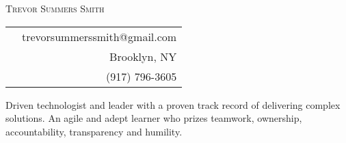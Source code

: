 \documentclass[letter]{article}
\begin{document}
\noindent \Huge \textsc{Trevor Summers Smith} \hfill \small
\begin{tabular}{rr}
& trevorsummerssmith@gmail.com \\
& Brooklyn, NY \\
& (917) 796-3605 \\
\end{tabular}

\normalsize

\vspace{7 mm}
\noindent Driven technologist and leader with a proven track record of delivering complex solutions.
An agile and adept learner who prizes teamwork, ownership, accountability, transparency and humility.
\vspace{7 mm}
\end{document}
